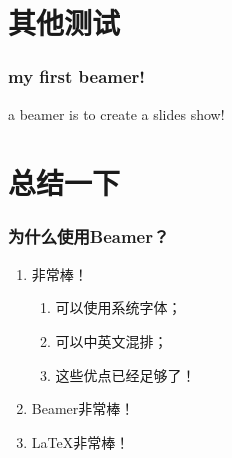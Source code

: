 \documentclass[presentation]{beamer}
\begin{document}




\section{其他测试}


\begin{frame}
\frametitle{my first beamer!}
\begin{definition}
a \alert{beamer} is to create a slides show!
\end{definition}
\end{frame}


\section{总结一下}


\begin{frame}
    \frametitle{为什么使用Beamer？}
    \begin{enumerate}
      \item \XeLaTeX 非常棒！
      \begin{enumerate}
        \item 可以使用系统字体；
        \item 可以中英文混排；
        \item 这些优点已经足够了！
      \end{enumerate}
      \item Beamer非常棒！
      \item \LaTeX 非常棒！
    \end{enumerate}
\end{frame}
\end{document}

